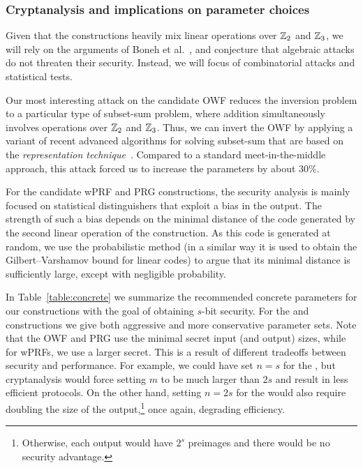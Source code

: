 \begin{itemize}
\end{itemize}

\subsubsection{Cryptanalysis and implications on parameter choices}
Given that the constructions heavily mix linear operations over $\mathbb{Z}_2$ and $\mathbb{Z}_3$,
we will rely on the arguments of Boneh et al.~\cite{boneh2018-darkmatter},
and conjecture that algebraic attacks do not threaten their security.
Instead, we will focus of combinatorial attacks and statistical tests.

Our most interesting attack on the
candidate OWF reduces the inversion problem to a particular type of subset-sum problem,
where addition simultaneously involves operations over $\mathbb{Z}_2$ and $\mathbb{Z}_3$.
Thus, we can invert the OWF by applying a variant of recent advanced algorithms
for solving subset-sum that are based on the
\emph{representation technique}~\cite{Howgrave-GrahamJ10,BeckerCJ11,BonnetainBSS20}.
Compared to a standard meet-in-the-middle approach,
this attack forced us to increase the parameters by about $30\%$.

For the candidate wPRF and PRG constructions,
the security analysis is mainly focused on
statistical distinguishers that exploit a bias in the output.
The strength of such a bias depends on the minimal distance of the
code generated by the second linear operation of the construction.
As this code is generated at random, we use the probabilistic method
(in a similar way it is used to obtain the Gilbert–Varshamov bound for linear codes)
to argue that its minimal distance is sufficiently large, except with negligible probability.


In Table~\ref{table:concrete} we summarize the recommended
concrete parameters for our constructions 
with the goal of obtaining $s$-bit security. For the \ttOWF and \ttwPRF constructions
we give both aggressive and more conservative parameter sets.
Note that the OWF and PRG use the minimal secret input (and output)
sizes, while for wPRFs, we use a larger secret. 
This is a result of different tradeoffs between security and performance.
For example, we could have set $n = s$ for the \ttwPRF, but cryptanalysis would
force setting $m$ to be much larger than $2s$ and result in less efficient protocols.
On the other hand, setting $n = 2s$ for the \ttOWF would also require 
doubling the size of the output,\footnote{
Otherwise, each output would have $2^s$ preimages and there would be no security advantage.}
once again, degrading efficiency.

